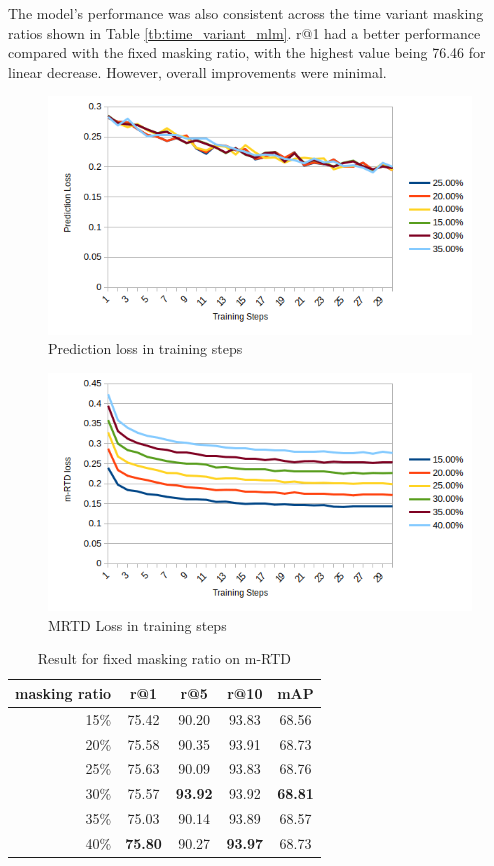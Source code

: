 The model's performance was also consistent across the time variant masking ratios shown in Table \ref{tb:time_variant_mlm}. r@1 had a better performance compared with the fixed masking ratio, with the highest value being 76.46 for linear decrease. However, overall improvements were minimal.

\begin{figure}
    \includegraphics[width=\linewidth]{img/mrtd_prd_loss.png}
    \caption{Prediction loss in training steps}
    \label{img:mrtd_prd_loss}
\end{figure}

\begin{figure}
    \includegraphics[width=\linewidth]{img/mrtd_loss.png}
    \caption{MRTD Loss in training steps}
    \label{img:mrtd_loss}
\end{figure}

\begin{table}[htbp]
  \centering
  \caption{Result for fixed masking ratio on m-RTD}
  \label{tb:mrtd_fixed}
  \begin{tabular}{rcccc}
    masking ratio & r@1 & r@5 & r@10 & mAP \\ \hline
    15\% & 75.42 & 90.20 & 93.83 & 68.56 \\
    20\% & 75.58 & 90.35 & 93.91 & 68.73 \\
    25\% & 75.63 & 90.09 & 93.83 & 68.76 \\
    30\% & 75.57 & \textbf{93.92} & 93.92 & \textbf{68.81} \\
    35\% & 75.03 & 90.14 & 93.89 & 68.57 \\
    40\% & \textbf{75.80} & 90.27 & \textbf{93.97} & 68.73
  \end{tabular}
\end{table}


